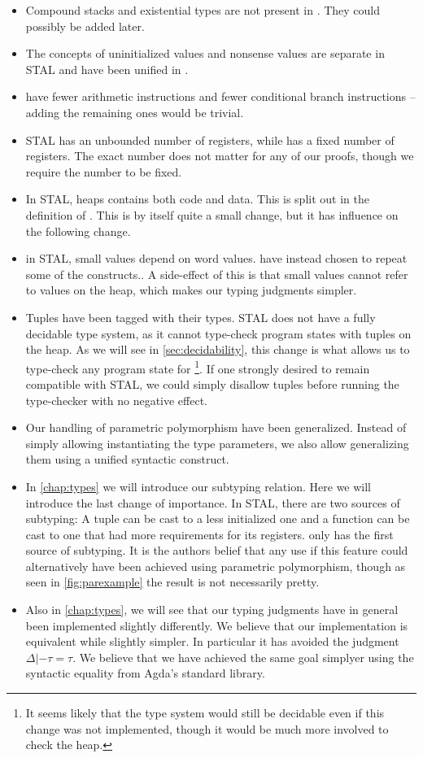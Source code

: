 \begin{itemize}
\item Compound stacks and existential types are not present in \ATAL. They could
  possibly be added later.
\item The concepts of uninitialized values and nonsense values are separate in
  STAL and have been unified in \ATAL.
\item \ATAL have fewer arithmetic instructions and fewer conditional branch
  instructions -- adding the remaining ones would be trivial.
\item STAL has an unbounded number of registers, while \ATAL has a fixed number
  of registers. The exact number does not matter for any of our proofs, though
  we require the number to be fixed.
\item In STAL, heaps contains both code and data. This is split out in the
  definition of \ATAL. This is by itself quite a small change, but it has
  influence on the following change.
\item in STAL, small values depend on word values. \ATAL have instead chosen to
  repeat some of the constructs.. A side-effect of this is that small values
  cannot refer to values on the heap, which makes our typing judgments simpler.
\item Tuples have been tagged with their types. STAL does not have a fully
  decidable type system, as it cannot type-check program states with tuples
  on the heap. As we will see in \cref{sec:decidability}, this change is what
  allows us to type-check any program state for \ATAL\footnote{It seems likely
    that the type system would still be decidable even if this change was not
    implemented, though it would be much more involved to check the heap.}. If
  one strongly desired to remain compatible with STAL, we could simply disallow
  tuples before running the type-checker with no negative effect.
\item Our handling of parametric polymorphism have been generalized. Instead of
  simply allowing instantiating the type parameters, we also allow generalizing
  them using a unified syntactic construct.
\item In \cref{chap:types} we will introduce our subtyping relation. Here we
  will introduce the last change of importance. In STAL, there are two sources
  of subtyping: A tuple can be cast to a less initialized one and a function
  can be cast to one that had more requirements for its registers. \ATAL only
  has the first source of subtyping. It is the authors belief that any use if
  this feature could alternatively have been achieved using parametric
  polymorphism, though as seen in \cref{fig:parexample} the result is not
  necessarily pretty.
\item Also in \cref{chap:types}, we will see that our typing judgments have in
  general been implemented slightly differently. We believe that our
  implementation is equivalent while slightly simpler. In particular it has
  avoided the judgment $\Delta |- \tau = \tau$. We believe that we have achieved
  the same goal simplyer using the syntactic equality from Agda's standard
  library.
\end{itemize}

